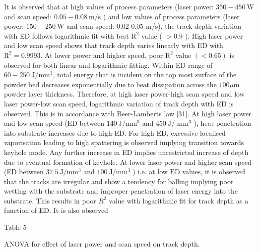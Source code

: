 \documentclass[10pt]{article}
\begin{document}
It is observed that at high values of process parameters (laser power: $350-450 \mathrm{~W}$ and scan speed: $0.05-0.08 \mathrm{~m} / \mathrm{s}$ ) and low values of process parameters (laser power: $150-250 \mathrm{~W}$ and scan speed: 0.02-0.05 m/s), the track depth variation with ED follows logarithmic fit with best $\mathrm{R}^{2}$ value ( $>0.9$ ). High laser power and low scan speed shows that track depth varies linearly with ED with $\mathrm{R}^{2}=0.9993$. At lower power and higher speed, poor $\mathrm{R}^{2}$ value $(<0.65)$ is observed for both linear and logarithmic fitting. Within ED range of $60-250 \mathrm{~J} / \mathrm{mm}^{3}$, total energy that is incident on the top most surface of the powder bed decreases exponentially due to heat dissipation across the $100 \mu \mathrm{m}$ powder layer thickness. Therefore, at high laser power-high scan speed and low laser power-low scan speed, logarithmic variation of track depth with ED is observed. This is in accordance with Beer-Lamberts law [31]. At high laser power and low scan speed (ED between $140 \mathrm{~J} / \mathrm{mm}^{3}$ and $450 \mathrm{~J} /$ $\mathrm{mm}^{3}$ ), heat penetration into substrate increases due to high ED. For high ED, excessive localised vaporisation leading to high spattering is observed implying transition towards keyhole mode. Any further increase in ED implies unrestricted increase of depth due to eventual formation of keyhole. At lower laser power and higher scan speed (ED between $37.5 \mathrm{~J} / \mathrm{mm}^{3}$ and $100 \mathrm{~J} / \mathrm{mm}^{3}$ ) i.e. at low $\mathrm{ED}$ values, it is observed that the tracks are irregular and show a tendency for balling implying poor wetting with the substrate and improper penetration of laser energy into the substrate. This results in poor $R^{2}$ value with logarithmic fit for track depth as a function of ED. It is also observed

Table 5

ANOVA for effect of laser power and scan speed on track depth.
\end{document}
